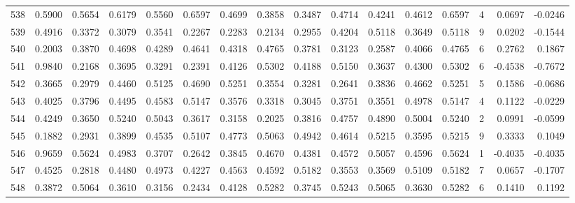 \begin{tabular}{lrrrrrrrrrrrrrrr}
538 &      0.5900 &  0.5654 &  0.6179 &  0.5560 &  0.6597 &  0.4699 &  0.3858 &  0.3487 &  0.4714 &  0.4241 &   0.4612 &     0.6597 &      4 &                    0.0697 &                    -0.0246 \\
539 &      0.4916 &  0.3372 &  0.3079 &  0.3541 &  0.2267 &  0.2283 &  0.2134 &  0.2955 &  0.4204 &  0.5118 &   0.3649 &     0.5118 &      9 &                    0.0202 &                    -0.1544 \\
540 &      0.2003 &  0.3870 &  0.4698 &  0.4289 &  0.4641 &  0.4318 &  0.4765 &  0.3781 &  0.3123 &  0.2587 &   0.4066 &     0.4765 &      6 &                    0.2762 &                     0.1867 \\
541 &      0.9840 &  0.2168 &  0.3695 &  0.3291 &  0.2391 &  0.4126 &  0.5302 &  0.4188 &  0.5150 &  0.3637 &   0.4300 &     0.5302 &      6 &                   -0.4538 &                    -0.7672 \\
542 &      0.3665 &  0.2979 &  0.4460 &  0.5125 &  0.4690 &  0.5251 &  0.3554 &  0.3281 &  0.2641 &  0.3836 &   0.4662 &     0.5251 &      5 &                    0.1586 &                    -0.0686 \\
543 &      0.4025 &  0.3796 &  0.4495 &  0.4583 &  0.5147 &  0.3576 &  0.3318 &  0.3045 &  0.3751 &  0.3551 &   0.4978 &     0.5147 &      4 &                    0.1122 &                    -0.0229 \\
544 &      0.4249 &  0.3650 &  0.5240 &  0.5043 &  0.3617 &  0.3158 &  0.2025 &  0.3816 &  0.4757 &  0.4890 &   0.5004 &     0.5240 &      2 &                    0.0991 &                    -0.0599 \\
545 &      0.1882 &  0.2931 &  0.3899 &  0.4535 &  0.5107 &  0.4773 &  0.5063 &  0.4942 &  0.4614 &  0.5215 &   0.3595 &     0.5215 &      9 &                    0.3333 &                     0.1049 \\
546 &      0.9659 &  0.5624 &  0.4983 &  0.3707 &  0.2642 &  0.3845 &  0.4670 &  0.4381 &  0.4572 &  0.5057 &   0.4596 &     0.5624 &      1 &                   -0.4035 &                    -0.4035 \\
547 &      0.4525 &  0.2818 &  0.4480 &  0.4973 &  0.4227 &  0.4563 &  0.4592 &  0.5182 &  0.3553 &  0.3569 &   0.5109 &     0.5182 &      7 &                    0.0657 &                    -0.1707 \\
548 &      0.3872 &  0.5064 &  0.3610 &  0.3156 &  0.2434 &  0.4128 &  0.5282 &  0.3745 &  0.5243 &  0.5065 &   0.3630 &     0.5282 &      6 &                    0.1410 &                     0.1192 \\

\end{tabular}
